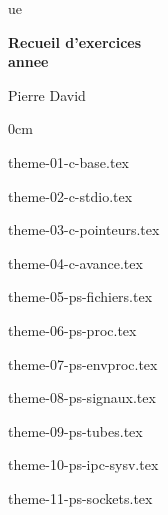 \documentclass [twoside] {report}
\newcommand {\tassertoc} {{ \setlength {\parskip} {0cm} \tableofcontents }}
\newcommand {\marquerchapitre} [1]
    {
        \addcontentsline {toc} {chapter} {#1}
        \markboth {#1} {#1}
    }
\newcommand {\chapitresanstitre} [1]
    {
        \cleardoublepage
	\marquerchapitre {#1}
    }
\newcommand {\titrechapitre} [1]
    {
	\begin {center}
	    \Large \bf #1
	\end {center}
	\bigskip
	\bigskip
    }
\newcommand {\chapitre} [1]
    {
        \chapitresanstitre {#1}
        \titrechapitre {#1}
    }
\newcounter {td}
\newcounter {tp}
\newcounter {exercice} [tp]
\begin{document}
\thispagestyle {empty}

\begin {titlepage}
     {ue}

    \vfill

    \begin {center}
	\huge\bf
	Recueil d'exercices \\
	\vspace* {5mm}
	 {annee}
    \end {center}

    \vfill

    \begin {flushright}
	Pierre David
    \end {flushright}
\end {titlepage}

\cleardoublepage
\tassertoc


% 
% 
% 
% 
% 
% 
% 


 {theme-01-c-base.tex}

 {theme-02-c-stdio.tex}

 {theme-03-c-pointeurs.tex}

 {theme-04-c-avance.tex}

 {theme-05-ps-fichiers.tex}

 {theme-06-ps-proc.tex}

 {theme-07-ps-envproc.tex}

 {theme-08-ps-signaux.tex}

 {theme-09-ps-tubes.tex}

 {theme-10-ps-ipc-sysv.tex}

 {theme-11-ps-sockets.tex}
\end{document}
